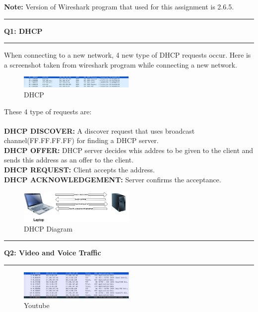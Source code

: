 \documentclass[11pt]{article}
\newcommand\question[2]{\vspace{.25in}\hrule\textbf{#1: #2}\vspace{.5em}\hrule\vspace{.10in}}
\begin{document}
\raggedright
	\newcommand\NAME{Muhammed Burak Bugrul}
	\newcommand\ANDREWID{150140015}
	\newcommand\HWNUM{2}
	
	\textbf{Note:} Version of Wireshark program that used for this assignment is 2.6.5.
	\question{Q1}{DHCP}
	
	When connecting to a new network, 4 new type of DHCP requests occur. Here is a screenshot taken from wireshark program while connecting a new network.
	
	\begin{figure}[h!]
		\centering
		\includegraphics[width=0.5\textwidth]{images/dhcp-wireshark.png}
		\caption{DHCP}
		\label{fig:DHCP}
	\end{figure}

	These 4 type of requests are:\\ \ \\
	\textbf{DHCP DISCOVER:} A discover request that uses broadcast channel(FF.FF.FF.FF) for finding a DHCP server.\\
	\textbf{DHCP OFFER:} DHCP server decides whis addres to be given to the client and sends this address as an offer to the client.\\
	\textbf{DHCP REQUEST:} Client accepts the address.\\
	\textbf{DHCP ACKNOWLEDGEMENT:} Server confirms the acceptance.\\

	\begin{figure}[H]
		\centering
		\includegraphics[width=0.5\textwidth]{images/dhcp-diagram.png}
		\caption{DHCP Diagram}
		\label{fig:DHCP Diagram}
	\end{figure}

	\question{Q2}{Video and Voice Traffic}
	
	\begin{figure}[H]
		\centering
		\includegraphics[width=0.5\textwidth]{images/video.png}
		\caption{Youtube}
		\label{fig:Youtube}
	\end{figure}
\end{document}
